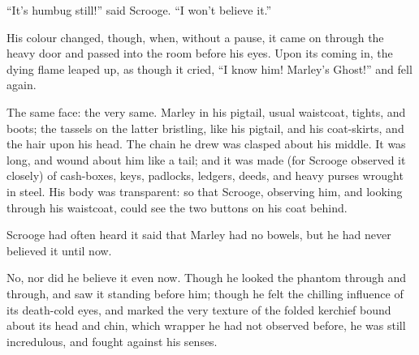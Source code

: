 \documentclass[paper=5.5in:8.5in,BCOR=7mm,twoside,DIV=calc,12pt,usegeometry]{scrbook} %
\begin{document}
\enquote{It's humbug still!} said Scrooge. \enquote{I won't believe it.}

His colour changed, though, when, without a pause, it came on through the heavy door and passed into the room before his eyes. Upon its coming in, the dying flame leaped up, as though it cried, \enquote{I know him! Marley's Ghost!} and fell again.

The same face: the very same. Marley in his pigtail, usual waistcoat, tights, and boots; the tassels on the latter bristling, like his pigtail, and his coat-skirts, and the hair upon his head. The chain he drew was clasped about his middle. It was long, and wound about him like a tail; and it was made (for Scrooge observed it closely) of cash-boxes, keys, padlocks, ledgers, deeds, and heavy purses wrought in steel. His body was transparent: so that Scrooge, observing him, and looking through his waistcoat, could see the two buttons on his coat behind.

Scrooge had often heard it said that Marley had no bowels, but he had never believed it until now.

No, nor did he believe it even now. Though he looked the phantom through and through, and saw it standing before him; though he felt the chilling influence of its death-cold eyes, and marked the very texture of the folded kerchief bound about its head and chin, which wrapper he had not observed before, he was still incredulous, and fought against his senses.
\end{document}
